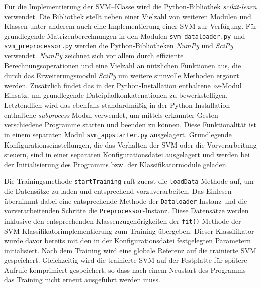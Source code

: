 


Für die Implementierung der \ac{SVM}--Klasse wird die Python-Bibliothek \textit{scikit-learn} verwendet. 
Die Bibliothek stellt neben einer Vielzahl von weiteren Modulen und Klassen unter anderem auch eine Implementierung einer \ac{SVM} zur Verfügung.
Für grundlegende Matrizenberechnungen in den Modulen \texttt{svm\_dataloader.py} und \texttt{svm\_preprocessor.py} werden die Python-Bibliotheken \textit{NumPy} und \textit{SciPy} verwendet. 
\textit{NumPy} zeichnet sich vor allem durch effiziente Berechnungsoperationen und eine Vielzahl an nützlichen Funktionen aus, die durch das Erweiterungsmodul \textit{SciPy} um weitere sinnvolle Methoden ergänzt werden.
Zusätzlich findet das in der Python-Installation enthaltene \textit{os}-Modul Einsatz, um grundlegende Dateipfadkonkatenationen zu bewerkstelligen.
Letztendlich wird das ebenfalls standardmäßig in der Python-Installation enthaltene \textit{subprocess}-Modul verwendet, um mittels erkannter Gesten verschiedene Programme starten und beenden zu können.
Diese Funktionalität ist in einem separaten Modul \texttt{svm\_appstarter.py} ausgelagert.
Grundlegende Konfigurationseinstellungen, die das Verhalten der \ac{SVM} oder die Vorverarbeitung steuern, sind in einer separaten Konfigurationsdatei ausgelagert und werden bei der Initialisierung des Programms bzw. der Klassifikatormodule geladen.

Die Trainingsmethode \texttt{startTraining} ruft zuerst die \texttt{loadData}-Methode auf, um die Datensätze zu laden und entsprechend vorzuverarbeiten.
Das Einlesen übernimmt dabei eine entsprechende Methode der \texttt{Dataloader}-Instanz und die vorverarbeitenden Schritte die \texttt{Preprocessor}-Instanz.
Diese Datensätze werden inklusive den entsprechenden Klassenzugehörigkeiten der \texttt{fit()}-Methode der \ac{SVM}-Klassifikatorimplementierung zum Training übergeben.
Dieser Klassifikator wurde davor bereits mit den in der Konfigurationsdatei festgelegten Parametern initialisiert.
Nach dem Training wird eine globale Referenz auf die trainierte \ac{SVM} gespeichert.
Gleichzeitig wird die trainierte \ac{SVM} auf der Festplatte für spätere Aufrufe komprimiert gespeichert, so dass nach einem Neustart des Programms das Training nicht erneut ausgeführt werden muss.

